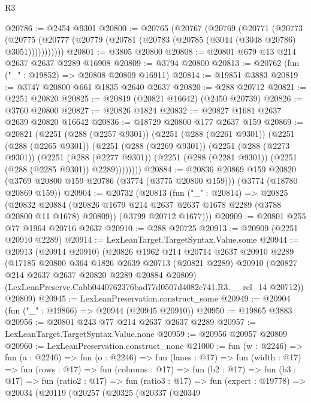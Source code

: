 \begin{lexlean}{R3}
\begin{coremodule}
@20786 := @2454 @9301
@20800 := @20765
    (@20767
      (@20769
        (@20771
          (@20773
            (@20775 (@20777 (@20779 (@20781 (@20783 (@20785 (@3044 (@3048 @20786) @3051)))))))))))
@20801 := @3805 @20800
@20808 := @20801 @679 @13 @214 @2637 @2637 @2289 @16908
@20809 := @3794 @20800
@20813 := @20762 (fun ("_" : @19852) => @20808 @20809 @16911)
@20814 := @19851 @3883
@20819 := @3747 @20800 @661 @1835 @2640 @2637
@20820 := @288 @20712
@20821 := @2251 @20820
@20825 := @20819 (@20821 @16642) (@2450 @20739)
@20826 := @3760 @20800
@20827 := @20826 @1824
@20832 := @20827 @1681 @2637 @2639 @20820 @16642
@20836 := @18729 @20800 @177 @2637 @159
@20869 := @20821
    (@2251
      (@288 (@2257 @9301))
      (@2251
        (@288 (@2261 @9301))
        (@2251
          (@288 (@2265 @9301))
          (@2251
            (@288 (@2269 @9301))
            (@2251
              (@288 (@2273 @9301))
              (@2251
                (@288 (@2277 @9301))
                (@2251 (@288 (@2281 @9301)) (@2251 (@288 (@2285 @9301)) @2289))))))))
@20884 := @20836
    @20869
    @159
    @20820
    (@3769 @20800 @159 @20786 (@3774 (@3775 @20800 @159)))
    (@3774 (@18780 @20869 @159))
@20904 := @20732
    (@20813
      (fun ("_" : @20814) =>
      @20825
        (@20832 @20884 (@20826 @1679 @214 @2637 @2637 @1678 @2289 (@3788 @20800 @11 @1678) @20809))
        (@3799 @20712 @1677)))
@20909 := @20801 @255 @77 @1964 @20716 @2637
@20910 := @288 @20725
@20913 := @20909 (@2251 @20910 @2289)
@20914 := LexLeanTarget.TargetSyntax.Value.some
@20944 := @20913
    (@20914 @20910)
    (@20826
      @1962
      @214
      @20714
      @2637
      @20910
      @2289
      (@17185
        @20800
        @364
        @1826
        @2639
        @20713
        (@20821 @2289)
        @20910
        (@20827 @214 @2637 @2637 @20820 @2289 @20884 @20809)
        (LexLeanPreserve.Cabb0440762376bad77d0507d4082c741.R3.__rel_14 @20712))
      @20809)
@20945 := LexLeanPreservation.construct_some
@20949 := @20904 (fun ("_" : @19866) => @20944 (@20945 @20910))
@20950 := @19865 @3883
@20956 := @20801 @243 @77 @214 @2637 @2637 @2289
@20957 := LexLeanTarget.TargetSyntax.Value.none
@20959 := @20956 @20957 @20809
@20960 := LexLeanPreservation.construct_none
@21000 := fun (w : @2246) =>
  fun (a : @2246) =>
  fun (o : @2246) =>
  fun (lanes : @17) =>
  fun (width : @17) =>
  fun (rows : @17) =>
  fun (columns : @17) =>
  fun (b2 : @17) =>
  fun (b3 : @17) =>
  fun (ratio2 : @17) =>
  fun (ratio3 : @17) =>
  fun (expert : @19778) =>
  @20034
    (@20119
      (@20257
        (@20325
          (@20337
            (@20349

\end{coremodule}
\end{lexlean}
